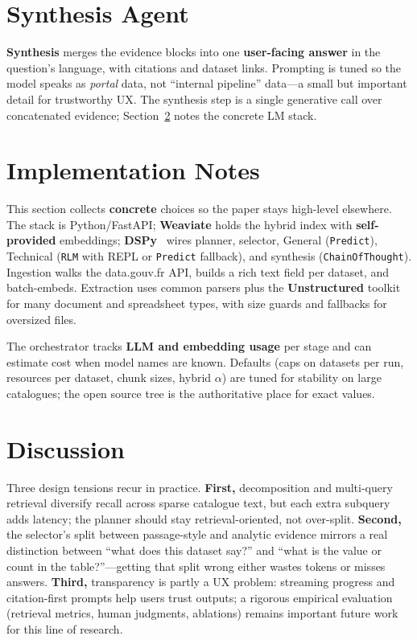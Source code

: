 \documentclass[sigconf,anonymous]{acmart}
\begin{document}
\section{Synthesis Agent}
\label{sec:synthesis}

\textbf{Synthesis} merges the evidence blocks into one \textbf{user-facing answer} in the question's language, with citations and dataset links. Prompting is tuned so the model speaks as \emph{portal} data, not ``internal pipeline'' data---a small but important detail for trustworthy UX. The synthesis step is a single generative call over concatenated evidence; Section~\ref{sec:implementation} notes the concrete LM stack.

\section{Implementation Notes}
\label{sec:implementation}

This section collects \textbf{concrete} choices so the paper stays high-level elsewhere. The stack is Python/FastAPI; \textbf{Weaviate} holds the hybrid index with \textbf{self-provided} embeddings; \textbf{DSPy}~\cite{khattab2023dspy} wires planner, selector, General (\texttt{Predict}), Technical (\texttt{RLM} with REPL or \texttt{Predict} fallback), and synthesis (\texttt{ChainOfThought}). Ingestion walks the data.gouv.fr API, builds a rich text field per dataset, and batch-embeds. Extraction uses common parsers plus the \textbf{Unstructured} toolkit for many document and spreadsheet types, with size guards and fallbacks for oversized files.

The orchestrator tracks \textbf{LLM and embedding usage} per stage and can estimate cost when model names are known. Defaults (caps on datasets per run, resources per dataset, chunk sizes, hybrid $\alpha$) are tuned for stability on large catalogues; the open source tree is the authoritative place for exact values.

\section{Discussion}
\label{sec:findings}

Three design tensions recur in practice. \textbf{First,} decomposition and multi-query retrieval diversify recall across sparse catalogue text, but each extra subquery adds latency; the planner should stay retrieval-oriented, not over-split. \textbf{Second,} the selector's split between passage-style and analytic evidence mirrors a real distinction between ``what does this dataset say?'' and ``what is the value or count in the table?''---getting that split wrong either wastes tokens or misses answers. \textbf{Third,} transparency is partly a UX problem: streaming progress and citation-first prompts help users trust outputs; a rigorous empirical evaluation (retrieval metrics, human judgments, ablations) remains important future work for this line of research.
\end{document}
